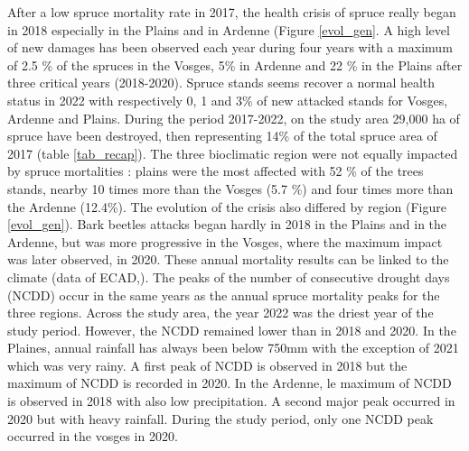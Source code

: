 \documentclass[3p,procedia]{elsarticle}
\begin{document}
After a low spruce mortality rate in 2017, the health crisis of spruce really began in 2018 especially in the Plains and in Ardenne (Figure \ref{evol_gen}.
A high level of new damages has been observed each year during four years with a maximum of 2.5 \% of the spruces in the Vosges, 5\% in Ardenne and 22 \% in the Plains after three critical years (2018-2020).
Spruce stands seems recover a normal health status in 2022 with respectively 0, 1 and 3\% of new attacked stands for Vosges, Ardenne and Plains.
During the period 2017-2022, on the study area 29,000 ha of spruce have been destroyed, then representing 14\%  of the total spruce area of 2017 (table \ref{tab_recap}).
The three bioclimatic region were not equally impacted by spruce mortalities : 
plains were the most affected with 52 \% of the trees stands,  nearby 10 times more than the Vosges (5.7 \%) and four times more than the Ardenne (12.4\%).
The evolution of the crisis also differed by region (Figure \ref{evol_gen}).
Bark beetles attacks began hardly in 2018 in the Plains and in the Ardenne, but was more progressive in the Vosges, where the maximum impact was later observed, in 2020.
These annual mortality results can be linked to the climate (data of ECAD,\citep{ecad}). 
The peaks of the number of consecutive drought days (NCDD) occur in the same years as the annual spruce mortality peaks for the three regions.
Across the study area, the year 2022 was the driest year of the study period. However, the NCDD remained lower than in 2018 and 2020.  
In the Plaines, annual rainfall has always been below 750mm with the exception of 2021 which was very rainy. A first peak of NCDD is observed in 2018 but the maximum of NCDD is recorded in 2020.
In the Ardenne, le maximum of NCDD is observed in 2018 with also low precipitation. A second major peak occurred in 2020 but with heavy rainfall.
During the study period, only one NCDD peak occurred in the vosges in 2020.
\end{document}
